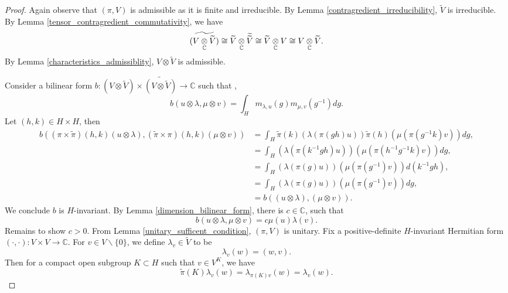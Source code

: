 \documentclass[8pt]{article}
\newcommand{\C}[0]{\mathbb{C}}
\newcommand{\zero}[0]{\{0\}}
\newcommand{\nonzero}[0]{\backslash\zero}
\newcommand{\tens}[1]{%
  \mathbin{\mathop{\otimes}\displaylimits_{#1}}%
}
\begin{document}
\begin{proof}
  Again observe that $(\pi,V)$ is admissible as it is finite and irreducible. By Lemma \ref{contragredient_irreducibility}, $\widetilde{V}$ is irreducible. By Lemma \ref{tensor_contragredient_commutativity}, we have 
  \begin{equation*}
    \widetilde{(V\tens{\C}\widetilde{V})} \cong \widetilde{V}\tens{\C}\widetilde{\widetilde{V}} \cong \widetilde{V}\tens{\C}V \cong V\tens{\C}\widetilde{V}.
  \end{equation*}
  By Lemma \ref{characteristics_admissiblity}, $V\otimes\widetilde{V}$ is admissible. 
  \par Consider a bilinear form $b:(V\otimes \widetilde{V})\times \widetilde{(V\otimes \widetilde{V})}\to\C$ such that ,
  \begin{equation*}
    b(u\otimes\lambda,\mu\otimes v) = \int_Hm_{\lambda,u}(g)m_{\mu,v}(g^{-1})dg.
  \end{equation*}
  Let $(h,k)\in H\times H$, then
  \begin{align*}
    b((\pi\times\widetilde{\pi})(h,k)(u\otimes\lambda),(\widetilde{\pi}\times\pi)(h,k)(\mu\otimes v)) & = \int_H \widetilde{\pi}(k)(\lambda(\pi(gh)u))\widetilde{\pi}(h)(\mu(\pi(g^{-1}k)v))dg,\\
    & = \int_H (\lambda(\pi(k^{-1}gh)u))(\mu(\pi(h^{-1}g^{-1}k)v))dg,\\
    & = \int_H (\lambda(\pi(g)u))(\mu(\pi(g^{-1})v))d(k^{-1}gh),\\
    & = \int_H (\lambda(\pi(g)u))(\mu(\pi(g^{-1})v))dg,\\
    & = b((u\otimes\lambda),(\mu\otimes v)).
  \end{align*}
  We conclude $b$ is $H$-invariant. By Lemma \ref{dimension_bilinear_form}, there is $c\in\C$, such that 
  \begin{equation*}
    b(u\otimes\lambda,\mu\otimes v) = c\mu(u)\lambda(v).
  \end{equation*}
  Remains to show $c>0$. From Lemma \ref{unitary_sufficent_condition}, $(\pi,V)$ is unitary. Fix a positive-definite $H$-invariant Hermitian form $(\cdot,\cdot):V\times V\to \C$. 
  For $v\in V\nonzero$, we define $\lambda_v\in\widetilde{V}$ to be 
  \begin{equation*}
    \lambda_v(w) = (w,v).
  \end{equation*}
  Then for a compact open subgroup $K\subset H$ such that $v\in V^K$, we have 
  \begin{equation*}
    \widetilde{\pi}(K)\lambda_v(w) = \lambda_{\pi(K)v}(w) = \lambda_v(w).

\end{equation*}
\end{proof}
\end{document}
